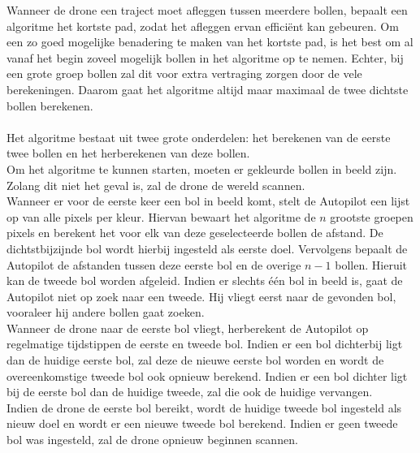 \noindent
Wanneer de drone een traject moet afleggen tussen meerdere bollen, bepaalt een algoritme het kortste pad, zodat het afleggen ervan effici\"ent kan gebeuren. Om een zo goed mogelijke benadering te maken van het kortste pad, is het best om al vanaf het begin zoveel mogelijk bollen in het algoritme op te nemen. Echter, bij een grote groep bollen zal dit voor extra vertraging zorgen door de vele berekeningen. Daarom gaat het algoritme altijd maar maximaal de twee dichtste bollen berekenen.
\\
\\
Het algoritme bestaat uit twee grote onderdelen: het berekenen van de eerste twee bollen en het herberekenen van deze bollen.
\\
Om het algoritme te kunnen starten, moeten er gekleurde bollen in beeld zijn. Zolang dit niet het geval is, zal de drone de wereld scannen.
\\
Wanneer er voor de eerste keer een bol in beeld komt, stelt de Autopilot een lijst op van alle pixels per kleur. Hiervan bewaart het algoritme de \(n\) grootste groepen pixels en berekent het voor elk van deze geselecteerde bollen de afstand. De dichtstbijzijnde bol wordt hierbij ingesteld als eerste doel. Vervolgens bepaalt de Autopilot de afstanden tussen deze eerste bol en de overige \(n-1\) bollen. Hieruit kan de tweede bol worden afgeleid. Indien er slechts \'e\'en bol in beeld is, gaat de Autopilot niet op zoek naar een tweede. Hij vliegt eerst naar de gevonden bol, vooraleer hij andere bollen gaat zoeken.
\\
Wanneer de drone naar de eerste bol vliegt, herberekent de Autopilot op regelmatige tijdstippen de eerste en tweede bol. Indien er een bol dichterbij ligt dan de huidige eerste bol, zal deze de nieuwe eerste bol worden en wordt de overeenkomstige tweede bol ook opnieuw berekend. Indien er een bol dichter ligt bij de eerste bol dan de huidige tweede, zal die ook de huidige vervangen.
\\
Indien de drone de eerste bol bereikt, wordt de huidige tweede bol ingesteld als nieuw doel en wordt er een nieuwe tweede bol berekend. Indien er geen tweede bol was ingesteld, zal de drone opnieuw beginnen scannen.